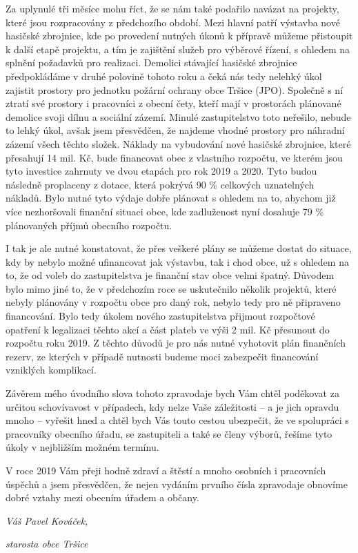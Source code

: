 \documentclass[11pt]{article}
\begin{document}
\begin{multicols}{3}
{Za uplynulé tři měsíce mohu říct, že se nám také podařilo navázat na projekty, které jsou rozpracovány z předchozího období. Mezi hlavní patří výstavba nové hasičské zbrojnice, kde po provedení nutných úkonů k přípravě můžeme přistoupit k další etapě projektu, a tím je zajištění služeb pro výběrové řízení, s ohledem na splnění požadavků pro realizaci. Demolici stávající hasičské zbrojnice předpokládáme v druhé polovině tohoto roku a čeká nás tedy nelehký úkol zajistit prostory pro jednotku požární ochrany obce Tršice (JPO). Společně s ní ztratí své prostory i pracovníci z obecní čety, kteří mají v prostorách plánované demolice svoji dílnu a sociální zázemí. Minulé zastupitelstvo toto neřešilo, nebude to lehký úkol, avšak jsem přesvědčen, že najdeme vhodné prostory pro náhradní zázemí všech těchto složek. Náklady na vybudování nové hasičské zbrojnice, které přesahují 14 mil. Kč, bude financovat obec z vlastního rozpočtu, ve kterém jsou tyto investice zahrnuty ve dvou etapách pro rok 2019 a 2020. Tyto budou následně proplaceny z dotace, která pokrývá 90 \% celkových uznatelných nákladů. Bylo nutné tyto výdaje dobře plánovat s ohledem na to, abychom již více nezhoršovali finanční situaci obce, kde zadluženost nyní dosahuje 79 \% plánovaných příjmů obecního rozpočtu.

I tak je ale nutné konstatovat, že přes veškeré plány se můžeme dostat do situace, kdy by nebylo možné ufinancovat jak výstavbu, tak i chod obce, už s ohledem na to, že od voleb do zastupitelstva je finanční stav obce velmi špatný. Důvodem bylo mimo jiné to, že v předchozím roce se uskutečnilo několik projektů, které nebyly plánovány v rozpočtu obce pro daný rok, nebylo tedy pro ně připraveno financování. Bylo tedy úkolem nového zastupitelstva přijmout rozpočtové opatření k legalizaci těchto akcí a část plateb ve výši 2 mil. Kč přesunout do rozpočtu roku 2019. Z těchto důvodů je pro nás nutné vyhotovit plán finančních rezerv, ze kterých v případě nutnosti budeme moci zabezpečit financování vzniklých komplikací.

Závěrem mého úvodního slova tohoto zpravodaje bych Vám chtěl poděkovat za určitou schovívavost v případech, kdy nelze Vaše záležitosti – a je jich opravdu mnoho – vyřešit hned a chtěl bych Vás touto cestou ubezpečit, že ve spolupráci s pracovníky obecního úřadu, se zastupiteli a také se členy výborů, řešíme tyto úkoly v nejbližším možném termínu.

V roce 2019 Vám přeji hodně zdraví a štěstí a mnoho osobních i pracovních úspěchů a jsem přesvědčen, že nejen vydáním prvního čísla zpravodaje obnovíme dobré vztahy mezi obecním úřadem a občany.

\emph{Váš Pavel Kováček,}

\emph{starosta obce Tršice}
}\end{multicols}
\end{document}

